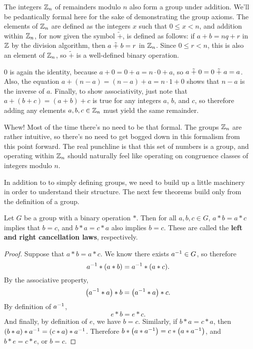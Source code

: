 \begin{example}
The integers $\zn[n]$ of remainders modulo $n$ also form a group under addition. We'll be pedantically formal here for the sake of demonstrating the group axioms. The elements of $\zn[n]$ are defined as the integers $x$ such that $0 \leq x < n$, and addition within $\zn[n]$, for now given the symbol $\tilde +$, is defined as follows: if $a + b = nq + r$ in $\z$ by the division algorithm, then $a \np b = r$ in $\zn[n]$. Since $0 \leq r < n$, this is also an element of $\zn[n]$, so $\tilde{+}$ is a well-defined binary operation.

$0$ is again the identity, because $a + 0 = 0 + a = n\cdot 0 + a$, so $a \np 0 = 0 \np a = a$. Also, the equation $a + (n-a) = (n-a) + a = n\cdot 1 + 0$ shows that $n-a$ is the inverse of $a$. Finally, to show associativity, just note that $a + (b + c) = (a + b) + c$ is true for any integers $a$, $b$, and $c$, so therefore adding any elements $a, b, c \in \zn[n]$ must yield the same remainder.
\end{example}

Whew! Most of the time there's no need to be that formal. The groups $\zn[n]$ are rather intuitive, so there's no need to get bogged down in this formalism from this point forward. The real punchline is that this set of numbers is a group, and operating within $\zn[n]$ should naturally feel like operating on congruence classes of integers modulo $n$.

In addition to to simply defining groups, we need to build up a little machinery in order to understand their structure. The next few theorems build only from the definition of a group.

\begin{theorem}
Let $G$ be a group with a binary operation $*$. Then for all $a, b, c \in G$, $a * b = a * c$ implies that $b = c$, and $b*a = c*a$ also implies $b=c$. These are called the \textbf{left and right cancellation laws}, respectively.
\end{theorem}

\begin{proof}
Suppose that $a*b = a*c$. We know there exists $\inv{a} \in G$, so therefore
\begin{equation*}
    \inv{a} * (a*b) = \inv{a} * (a*c).
\end{equation*}
By the associative property,
\begin{equation*}
    \left(\inv{a} * a\right) * b = \left(\inv{a} * a\right) * c.
\end{equation*}
By definition of $\inv{a}$,
\begin{equation*}
    e * b = e * c.
\end{equation*}
And finally, by definition of $e$, we have $b = c$. Similarly, if $b*a = c*a$, then $(b*a)*\inv{a} = (c*a)*\inv{a}$. Therefore $b*\left(a*\inv{a}\right) = c*\left(a*\inv{a}\right)$, and $b*e = c*e$, or $b = c$.

\end{proof}

